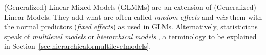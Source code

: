 \documentclass[a4paper,12pt]{article}
\newcommand{\ie}{i.\,e.,\ }
\begin{document}
(Generalized) Linear Mixed Models (GLMMs) are an extension of (Generalized) Linear Models.
They add what are often called \textit{random effects} and \textit{mix} them with the normal predictors (\textit{fixed effects}) as used in GLMs.
Alternatively, statisticians speak of \textit{multilevel models} or \textit{hierarchical models} \citep{GelmanHill2006}, a terminology to be explained in Section~\ref{sec:hierarchicalormultilevelmodels}.
\end{document}
